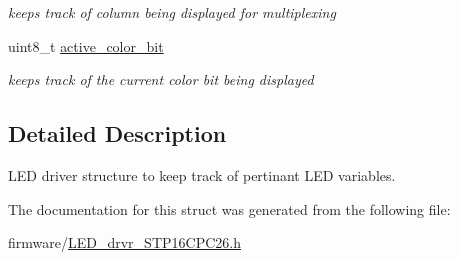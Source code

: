 \begin{DoxyCompactItemize}
\begin{DoxyCompactList}\small\item\em keeps track of column being displayed for multiplexing \end{DoxyCompactList}\item 
\hypertarget{struct_l_e_d__drvr__t_ad9507541a6ee6fba8d50fcbe0da5eb5d}{}\label{struct_l_e_d__drvr__t_ad9507541a6ee6fba8d50fcbe0da5eb5d} 
uint8\+\_\+t \hyperlink{struct_l_e_d__drvr__t_ad9507541a6ee6fba8d50fcbe0da5eb5d}{active\+\_\+color\+\_\+bit}
\begin{DoxyCompactList}\small\item\em keeps track of the current color bit being displayed \end{DoxyCompactList}\end{DoxyCompactItemize}


\subsection{Detailed Description}
L\+ED driver structure to keep track of pertinant L\+ED variables. 

The documentation for this struct was generated from the following file\+:\begin{DoxyCompactItemize}
\item 
firmware/\hyperlink{_l_e_d__drvr___s_t_p16_c_p_c26_8h}{L\+E\+D\+\_\+drvr\+\_\+\+S\+T\+P16\+C\+P\+C26.\+h}\end{DoxyCompactItemize}
